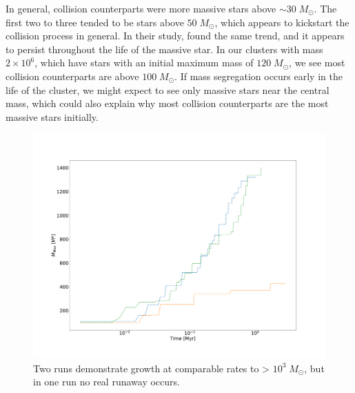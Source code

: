 \documentclass{princeton_astro_thesis}
\newcommand\Msun{\; M_\odot}
\numberwithin{equation}{section}
\begin{document}
In general, collision counterparts were more massive stars above $\sim 30 \Msun$. The first two to three tended to be stars above $50 \Msun$, which appears to kickstart the collision process in general. In their study, \citet{2004SPZ} found the same trend, and it appears to persist throughout the life of the massive star. In our clusters with mass $2 \times 10^6$, which have stars with an initial maximum mass of $120 \Msun$, we see most collision counterparts are above $100 \Msun$.  If mass segregation occurs early in the life of the cluster, we might expect to see only massive stars near the central mass, which could also explain why most collision counterparts are the most massive stars initially.
\begin{figure}
\centering
\includegraphics[width=\textwidth]{masstimesame}
\caption{Two runs demonstrate growth at comparable rates to > $10^3 \Msun$, but in one run no real runaway occurs.}
\label{fig:SameParamsMassTime}
\end{figure}
\end{document}
